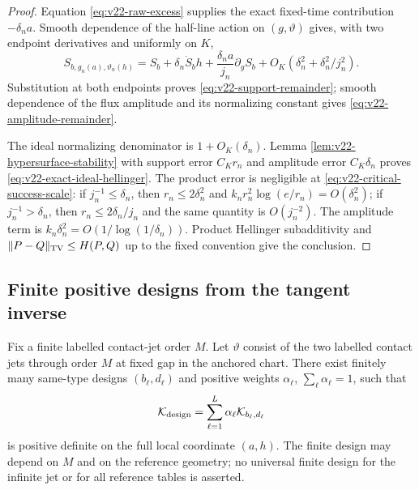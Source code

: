 \begin{proof}
Equation \eqref{eq:v22-raw-excess} supplies the exact fixed-time contribution
$-\delta_na$.  Smooth dependence of the half-line action on
$(g,\vartheta)$ gives, with two endpoint derivatives and uniformly on $K$,
\[
 S_{b,g_n(a),\vartheta_n(h)}
 =S_b+\delta_n\dot S_bh
 +\frac{\delta_na}{j_n}\partial_gS_b
 +O_K(\delta_n^2+\delta_n^2/j_n^2).
\]
Substitution at both endpoints proves
\eqref{eq:v22-support-remainder}; smooth dependence of the flux amplitude and
its normalizing constant gives \eqref{eq:v22-amplitude-remainder}.

The ideal normalizing denominator is $1+O_K(\delta_n)$.  Lemma
\ref{lem:v22-hypersurface-stability} with support error $C_Kr_n$ and amplitude
error $C_K\delta_n$ proves \eqref{eq:v22-exact-ideal-hellinger}.  The product
error is negligible at \eqref{eq:v22-critical-success-scale}: if
$j_n^{-1}\le\delta_n$, then $r_n\le2\delta_n^2$ and
$k_nr_n^2\log(e/r_n)=O(\delta_n^2)$; if
$j_n^{-1}>\delta_n$, then $r_n\le2\delta_n/j_n$ and the same quantity is
$O(j_n^{-2})$.  The amplitude term is
$k_n\delta_n^2=O(1/\log(1/\delta_n))$.  Product Hellinger subadditivity and
$\|P-Q\|_{\rm TV}\le H(P,Q)$ up to the fixed convention give the conclusion.
\end{proof}

\subsection{Finite positive designs from the tangent inverse}

\begin{lemma}
\label{lem:v22-finite-positive-design}
Fix a finite labelled contact-jet order $M$.  Let $\vartheta$ consist of the
two labelled contact jets through order $M$ at fixed gap in the anchored
chart.  There exist finitely many same-type designs $(b_\ell,d_\ell)$ and
positive weights $\alpha_\ell$, $\sum_\ell\alpha_\ell=1$, such that
\begin{equation}\label{eq:v22-design-information}
 \mathcal K_{\rm design}
 =\sum_{\ell=1}^L\alpha_\ell\mathcal K_{b_\ell,d_\ell}
\end{equation}
is positive definite on the full local coordinate $(a,h)$.  The finite design
may depend on $M$ and on the reference geometry; no universal finite design
for the infinite jet or for all reference tables is asserted.
\end{lemma}


